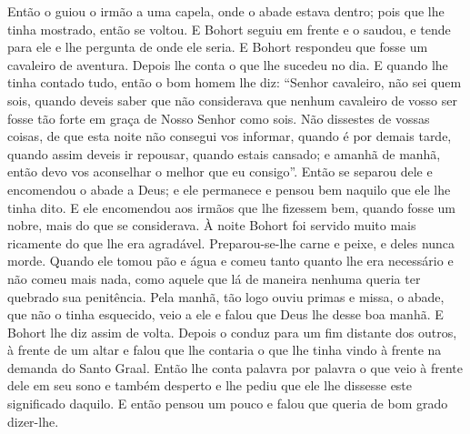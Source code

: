 Então o guiou o irmão a uma capela, onde o abade estava dentro; pois que lhe
tinha mostrado, então se voltou. E Bohort seguiu em frente e o saudou, e tende
para ele e lhe pergunta de onde ele seria. E Bohort respondeu que fosse um
cavaleiro de aventura. Depois lhe conta o que lhe sucedeu no dia. E quando lhe
tinha contado tudo, então o bom homem lhe diz: “Senhor cavaleiro, não sei quem
sois, quando deveis saber que não considerava que nenhum cavaleiro de vosso ser
fosse tão forte em graça de Nosso Senhor como sois. Não dissestes de vossas
coisas, de que esta noite não consegui vos informar, quando é por demais tarde,
quando assim deveis ir repousar, quando estais cansado; e amanhã de manhã, 
então devo vos aconselhar o melhor que eu consigo”. Então se separou dele e
encomendou o abade a Deus; e ele permanece e pensou bem naquilo que ele lhe
tinha dito. E ele encomendou aos irmãos que lhe fizessem bem, quando fosse um
nobre, mais do que se considerava. À noite Bohort foi servido muito
mais ricamente do que lhe era agradável. Preparou-se-lhe carne e peixe, e deles
nunca morde. Quando ele tomou pão e água e comeu tanto quanto lhe era
necessário e não comeu mais nada, como aquele que lá de maneira nenhuma queria
ter quebrado sua penitência. Pela manhã, tão logo ouviu primas e missa, o
abade, que não o tinha esquecido, veio a ele e falou que Deus lhe desse boa
manhã. E Bohort lhe diz assim de volta. Depois o conduz para um fim distante
dos outros, à frente de um altar e falou que lhe contaria o que lhe tinha vindo
à frente na demanda do Santo Graal. Então lhe conta palavra por palavra o que
veio à frente dele em seu sono e também desperto e lhe pediu que ele lhe
dissesse este significado daquilo. E então pensou um pouco e falou que queria
de bom grado dizer-lhe. 

